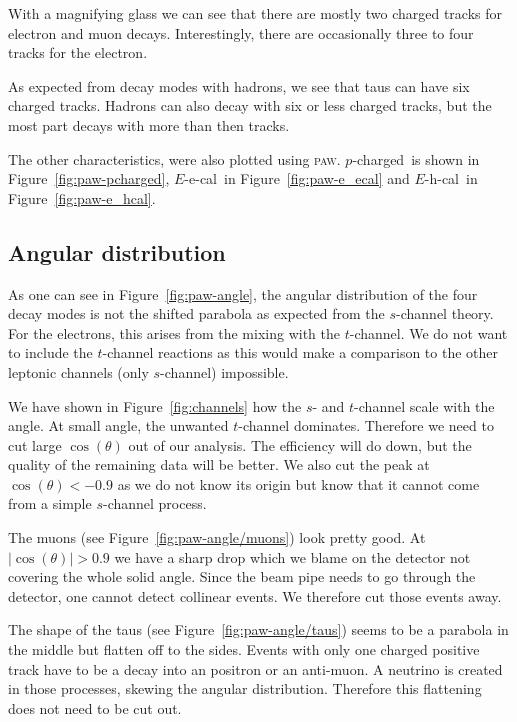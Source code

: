 \documentclass[11pt, english, fleqn, DIV=15, headinclude, BCOR=2cm]{scrreprt}
\newcommand\eecal{$E$-e-cal}
\newcommand\ehcal{$E$-h-cal}
\newcommand\pcharged{$p$-charged}
\begin{document}


With a magnifying glass we can see that there are mostly two charged tracks for
electron and muon decays. Interestingly, there are occasionally three to four
tracks for the electron.

As expected from decay modes with hadrons, we see that taus can have six
charged tracks. Hadrons can also decay with six or less charged tracks, but the
most part decays with more than then tracks.

The other characteristics, were also plotted using \textsc{paw}. \pcharged\ is
shown in Figure~\ref{fig:paw-pcharged}, \eecal\ in Figure~\ref{fig:paw-e_ecal}
and \ehcal\ in Figure~\ref{fig:paw-e_hcal}.

\subsection{Angular distribution}

As one can see in Figure~\ref{fig:paw-angle}, the angular distribution of the
four decay modes is not the shifted parabola as expected from the $s$-channel
theory. For the electrons, this arises from the mixing with the $t$-channel. We
do not want to include the $t$-channel reactions as this would make a
comparison to the other leptonic channels (only $s$-channel) impossible.

We have shown in Figure~\ref{fig:channels} how the $s$- and $t$-channel scale
with the angle. At small angle, the unwanted $t$-channel dominates. Therefore
we need to cut large $\cos(\theta)$ out of our analysis. The efficiency will do
down, but the quality of the remaining data will be better. We also cut the
peak at $\cos(\theta) < -0.9$ as we do not know its origin but know that it
cannot come from a simple $s$-channel process.



The muons (see Figure~\ref{fig:paw-angle/muons}) look pretty good. At
$|\cos(\theta)| > 0.9$ we have a sharp drop which we blame on the detector not
covering the whole solid angle. Since the beam pipe needs to go through the
detector, one cannot detect collinear events. We therefore cut those events
away.

The shape of the taus (see Figure~\ref{fig:paw-angle/taus}) seems to be a
parabola in the middle but flatten off to the sides. Events with only one
charged positive track have to be a decay into an positron or an anti-muon. A
neutrino is created in those processes, skewing the angular distribution.
Therefore this flattening does not need to be cut out.
\end{document}
